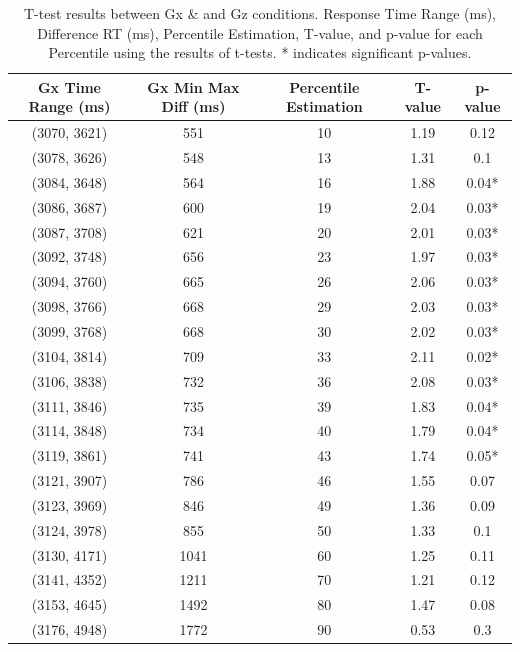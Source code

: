 \documentclass[12pt,oneside,openright]{report}
\begin{document}
\begin{table}[!ht]
    \centering
    \begin{tabular}{ccccc}
    \hline
    \textbf{Gx Time Range (ms)} & \textbf{Gx Min Max Diff (ms)} & \textbf{Percentile Estimation} & \textbf{T-value} & \textbf{p-value} \\ \hline
    (3070, 3621) & 551 & 10  & 1.19 & 0.12 \\
    (3078, 3626) & 548 & 13 & 1.31 & 0.1  \\
    (3084, 3648) & 564 & 16 & 1.88 & 0.04* \\
    (3086, 3687) & 600 & 19 & 2.04 & 0.03* \\
    (3087, 3708) & 621 & 20  & 2.01 & 0.03* \\
    (3092, 3748) & 656 & 23 & 1.97 & 0.03* \\
    (3094, 3760) & 665 & 26 & 2.06 & 0.03* \\
    (3098, 3766) & 668 & 29 & 2.03 & 0.03* \\
    (3099, 3768) & 668 & 30  & 2.02 & 0.03* \\
    (3104, 3814) & 709 & 33 & 2.11 & 0.02* \\
    (3106, 3838) & 732 & 36 & 2.08 & 0.03* \\
    (3111, 3846) & 735 & 39 & 1.83 & 0.04* \\
    (3114, 3848) & 734 & 40  & 1.79 & 0.04* \\
    (3119, 3861) & 741 & 43 & 1.74 & 0.05* \\
    (3121, 3907) & 786 & 46 & 1.55 & 0.07  \\
    (3123, 3969) & 846 & 49 & 1.36 & 0.09  \\
    (3124, 3978) & 855 & 50  & 1.33 & 0.1   \\
    (3130, 4171) & 1041 & 60  & 1.25 & 0.11  \\
    (3141, 4352) & 1211 & 70  & 1.21 & 0.12  \\
    (3153, 4645) & 1492 & 80  & 1.47 & 0.08  \\
    (3176, 4948) & 1772 & 90 & 0.53 & 0.3   \\ \hline
    \end{tabular}
    \caption{T-test results between Gx \& and Gz conditions. Response Time Range (ms), Difference RT (ms), Percentile Estimation, T-value, and p-value for each Percentile using the results of t-tests. * indicates significant p-values.}
    \label{tab:response-time-range}
\end{table}
\end{document}
